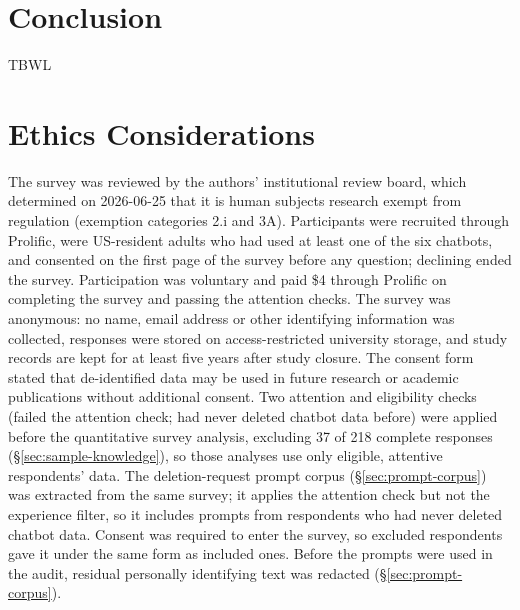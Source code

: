 \documentclass[conference,compsoc]{IEEEtran}
\begin{document}
\section{Conclusion}
TBWL

\section*{Ethics Considerations}
The survey was reviewed by the authors' institutional review board, which
determined on 2026-06-25 that it is human subjects research exempt from
regulation (exemption categories 2.i and 3A). Participants were recruited through Prolific, were
US-resident adults who had used at least one of the six chatbots, and
consented on the first page of the survey before any question; declining
ended the survey. Participation was voluntary and paid \$4 through
Prolific on completing the survey and passing the attention checks. The
survey was anonymous: no name, email address or other identifying
information was collected, responses were stored on access-restricted
university storage, and study records are kept for at least five years after
study closure. The consent form stated that de-identified data may be used
in future research or academic publications without additional consent.
Two attention and eligibility checks (failed the attention check; had never
deleted chatbot data before) were applied before the quantitative survey
analysis, excluding 37 of 218 complete responses
(\S\ref{sec:sample-knowledge}), so those analyses use only eligible,
attentive respondents' data. The deletion-request prompt corpus
(\S\ref{sec:prompt-corpus}) was extracted from the same survey; it applies the
attention check but not the experience filter, so it includes prompts from
respondents who had never deleted chatbot data. Consent was required to enter the survey, so excluded respondents gave it
under the same form as included ones. Before the prompts were used in the
audit, residual personally identifying text was redacted (\S\ref{sec:prompt-corpus}).
\end{document}
